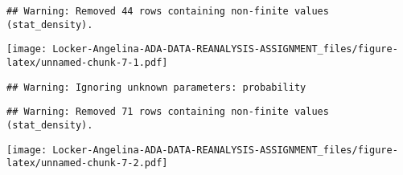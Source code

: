 \documentclass[]{article}
\newenvironment{Shaded}{\begin{snugshade}}{\end{snugshade}}
\newcommand{\KeywordTok}[1]{\textcolor[rgb]{0.13,0.29,0.53}{\textbf{#1}}}
\newcommand{\DataTypeTok}[1]{\textcolor[rgb]{0.13,0.29,0.53}{#1}}
\newcommand{\DecValTok}[1]{\textcolor[rgb]{0.00,0.00,0.81}{#1}}
\newcommand{\FloatTok}[1]{\textcolor[rgb]{0.00,0.00,0.81}{#1}}
\newcommand{\StringTok}[1]{\textcolor[rgb]{0.31,0.60,0.02}{#1}}
\newcommand{\OtherTok}[1]{\textcolor[rgb]{0.56,0.35,0.01}{#1}}
\newcommand{\OperatorTok}[1]{\textcolor[rgb]{0.81,0.36,0.00}{\textbf{#1}}}
\newcommand{\NormalTok}[1]{#1}
\begin{document}
\begin{verbatim}
## Warning: Removed 44 rows containing non-finite values (stat_density).
\end{verbatim}

\texttt{[image: Locker-Angelina-ADA-DATA-REANALYSIS-ASSIGNMENT\_files/figure-latex/unnamed-chunk-7-1.pdf]}

\begin{Shaded}
\end{Shaded}

\begin{verbatim}
## Warning: Ignoring unknown parameters: probability
\end{verbatim}

\begin{verbatim}
## Warning: Removed 71 rows containing non-finite values (stat_density).
\end{verbatim}

\texttt{[image: Locker-Angelina-ADA-DATA-REANALYSIS-ASSIGNMENT\_files/figure-latex/unnamed-chunk-7-2.pdf]}
\end{document}
